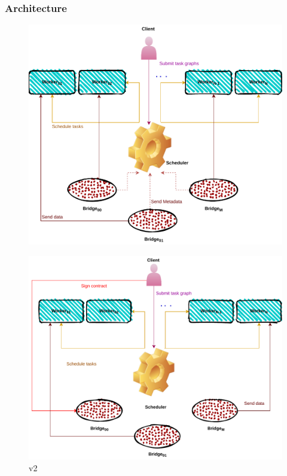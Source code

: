 \subsubsection{Architecture}
\begin{figure}[tb]\centering
\includegraphics{figures/ArchiectureDeisa.pdf}
\caption{\deisa}
\label{figdeida}
\end{figure}

\begin{figure}[tb]\centering
\includegraphics{figures/ArchiectureDeisaV2.pdf}
\caption{\deisa v2}
\label{figdeidav2}
\end{figure}
